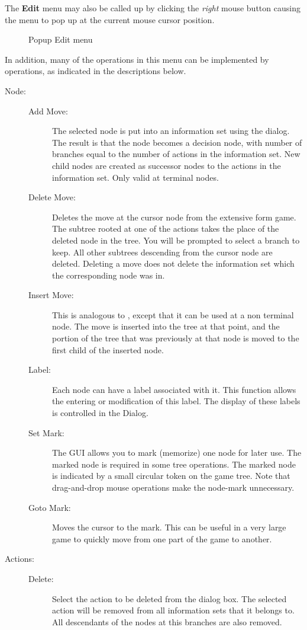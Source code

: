 The {\bf Edit} menu may also be called up by clicking the {\em right}
mouse button causing the menu to pop up at the current mouse cursor
position.

\begin{figure}
\caption{Popup Edit menu}
\end{figure}

In addition, many of the operations in this menu can be implemented by 
 operations, as indicated in the
descriptions below.  

\begin{description}
\item[Node:]
\begin{description}
\item[Add Move:] The selected node is put into an information set
using the  dialog.  The result is that the
node becomes a decision node, with number of branches equal to the
number of actions in the information set.  New child nodes are created
as successor nodes to the actions in the information set.  Only valid
at terminal nodes.  
\item[Delete Move:] Deletes the move at the cursor node from the
extensive form game.  The subtree rooted at one of the actions takes
the place of the deleted node in the tree.  You will be prompted to
select a branch to keep.  All other subtrees descending from the
cursor node are deleted.  Deleting a move does not delete
the information set which the corresponding node was in.
\item[Insert Move:] This is analogous to ,
except that it can be used at a non terminal node.  The move is
inserted into the tree at that point, and the portion of the tree that
was previously at that node is moved to the first child of the
inserted node.
\item[Label:] Each node can have a label associated with it.  This
function allows the entering or modification of this label.  The
display of these labels is controlled in the 
 Dialog.
\item[Set Mark:] The GUI allows you to mark (memorize) one node for
later use.  The marked node is required in some tree operations.  The
marked node is indicated by a small circular token on the game tree.
Note that drag-and-drop mouse operations make the node-mark
unnecessary.
\item[Goto Mark:]  Moves the cursor to the mark.  This can be useful in a 
very large game to quickly move from one part of the game to another. 
\end{description}
\item[Actions:]
\begin{description}
\item[Delete:] Select the action to be deleted from the dialog box.
The selected action will be removed from all information sets that it
belongs to.  All descendants of the nodes at this branches are also
removed.


\end{description}
\end{description}

